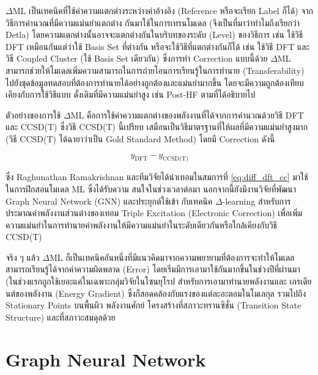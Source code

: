 $\Delta$ML เป็นเทคนิคที่ใช้ค่าความแตกต่างระหว่างค่าอ้างอิง (Reference หรือจะเรียก Label ก็ได้) จากวิธีการคำนวณที่มีความแม่นยำแตกต่าง%
กันมาใช้ในการเทรนโมเดล (จึงเป็นที่มาว่าทำไมถึงเรียกว่า Detla) โดยความแตกต่างนั้นอาจจะแตกต่างกันในบริบทของระดับ (Level) ของวิธีการ 
เช่น ใช้วิธี DFT เหมือนกันแต่ว่าใช้ Basis Set ที่ต่างกัน หรือจะใช้วิธีที่แตกต่างกันก็ได้ เช่น ใช้วิธี DFT และวิธี Coupled Cluster (ใช้ Basis 
Set เดียวกัน) ซึ่งการทำ Correction แบบนี้ด้วย $\Delta$ML สามารถช่วยให้โมเดลเพิ่มความสามารถในการถ่ายโอนการเรียนรู้ในการทำนาย 
(Transferability) ไปยังชุดข้อมูลทดสอบที่ต้องการทำนายได้อย่างถูกต้องและแม่นยำมากขึ้น โดยจะมีความถูกต้องเทียบเคียงกับการใช้วิธีแบบ%
ดั้งเดิมที่มีความแม่นยำสูง เช่น Post-HF ตามที่ได้อธิบายไป 

ตัวอย่างของการใช้ $\Delta$ML คือการใช้ค่าความแตกต่างของพลังงานที่ได้จากการคำนวณด้วยวิธี DFT และ CCSD(T) ซึ่งวิธี CCSD(T) นี้เปรียบ%
เสมือนเป็นวิธีมาตรฐานที่ให้ผลที่มีความแม่นยำสูงมาก (วิธี CCSD(T) ได้ฉายาว่าเป็น Gold Standard Method) โดยมี Correction ดังนี้

\begin{equation}\label{eq:diff_dft_cc}
    y_{\text{DFT}} - y_{\text{CCSD(T)}}
\end{equation}

ซึ่ง Raghunathan Ramakrishnan และทีมวิจัยได้นำเทอมในสมการที่ \ref{eq:diff_dft_cc} มาใช้ในการฝึกสอนโมเดล ML ซึ่งได้รับความ%
สนใจในช่วงเวลาต่อมา\autocite{ramakrishnan2015a} นอกจากนี้ยังมีงานวิจัยที่พัฒนา Graph Neural Network (GNN) และประยุกต์ใช้เข้า%
กับเทคนิค $\Delta$-learning สำหรับการประมาณค่าพลังงานส่วนต่างของเทอม Triple Excitation (Electronic Correction) 
เพื่อเพิ่มความแม่นยำในการทำนายค่าพลังงานให้มีความแม่นยำในระดับเดียวกันหรือใกล้เคียงกับวิธี CCSD(T)\autocite{ruth2022}

จริง ๆ แล้ว $\Delta$ML ก็เป็นเทคนิคอันหนึ่งที่มีแนวคิดมาจากความพยายามที่ต้องการจะทำให้โมเดลสามารถเรียนรู้ได้จากค่าความผิดพลาด (Error) 
โดยเริ่มมีการเอามาใช้กันมากขึ้นในช่วงปีที่ผ่านมา (ในช่วงแรกถูกใช้เยอะแค่ในเฉพาะกลุ่มวิจัยในโซนยุโรป สำหรับการเอามาทำนายพลังงานและ%
เกรเดียนต์ของพลังงาน (Energy Gradient) ซึ่งก็สอดคล้องกับแรงของแต่ละอะตอมในโมเลกุล รวมไปถึง Stationary Points บนพื้นผิว%
พลังงานศักย์ โครงสร้างที่สภาวะทรานซิชั่น (Transition State Structure) และที่สภาวะสมดุลด้วย

\section{Graph Neural Network}
\label{sec:gnn}

